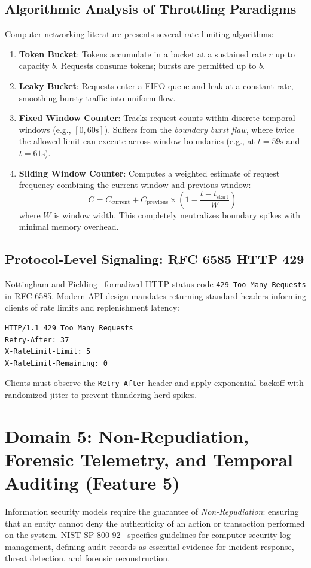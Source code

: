 \documentclass[10pt,twocolumn,a4paper]{article}
\begin{document}
\subsection{Algorithmic Analysis of Throttling Paradigms}
Computer networking literature presents several rate-limiting algorithms:
\begin{enumerate}[leftmargin=*]
    \item \textbf{Token Bucket}: Tokens accumulate in a bucket at a sustained rate $r$ up to capacity $b$. Requests consume tokens; bursts are permitted up to $b$.
    \item \textbf{Leaky Bucket}: Requests enter a FIFO queue and leak at a constant rate, smoothing bursty traffic into uniform flow.
    \item \textbf{Fixed Window Counter}: Tracks request counts within discrete temporal windows (e.g., $[0, 60\text{s}]$). Suffers from the \textit{boundary burst flaw}, where twice the allowed limit can execute across window boundaries (e.g., at $t=59\text{s}$ and $t=61\text{s}$).
    \item \textbf{Sliding Window Counter}: Computes a weighted estimate of request frequency combining the current window and previous window:
    \begin{equation}
    C = C_{\text{current}} + C_{\text{previous}} \times \left(1 - \frac{t - t_{\text{start}}}{W}\right)
    \end{equation}
    where $W$ is window width. This completely neutralizes boundary spikes with minimal memory overhead.
\end{enumerate}

\subsection{Protocol-Level Signaling: RFC 6585 HTTP 429}
Nottingham and Fielding~\cite{nottingham2012http429} formalized HTTP status code \texttt{429 Too Many Requests} in RFC 6585. Modern API design mandates returning standard headers informing clients of rate limits and replenishment latency:
\begin{verbatim}
HTTP/1.1 429 Too Many Requests
Retry-After: 37
X-RateLimit-Limit: 5
X-RateLimit-Remaining: 0
\end{verbatim}
Clients must observe the \texttt{Retry-After} header and apply exponential backoff with randomized jitter to prevent thundering herd spikes.

\section{Domain 5: Non-Repudiation, Forensic Telemetry, and Temporal Auditing (Feature 5)}
\label{sec:audit}
Information security models require the guarantee of \textit{Non-Repudiation}: ensuring that an entity cannot deny the authenticity of an action or transaction performed on the system. NIST SP 800-92~\cite{nist_sp800_92} specifies guidelines for computer security log management, defining audit records as essential evidence for incident response, threat detection, and forensic reconstruction.
\end{document}
